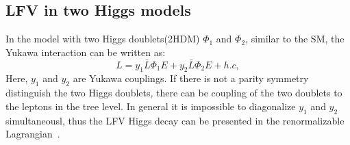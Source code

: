 \subsection{LFV in two Higgs models}

In the model with two Higgs doublets(2HDM) $\Phi_{1}$ and $\Phi_{2}$, similar to the SM, the Yukawa interaction can be written as: 
\begin{equation}
L=y_{1}\bar{L}\Phi_{1}E+y_{2}\bar{L}\Phi_{2}E+h.c,
\end{equation}
Here, $y_{1}$ and $y_{2}$ are Yukawa couplings. If there is not a parity symmetry distinguish the two Higgs doublets, there can be coupling of the two doublets to the leptons in the tree level. In general it is impossible to diagonalize $y_{1}$ and $y_{2}$ simultaneousl, thus the LFV Higgs decay can be presented in the renormalizable Lagrangian~\cite{deLima2015}.%


